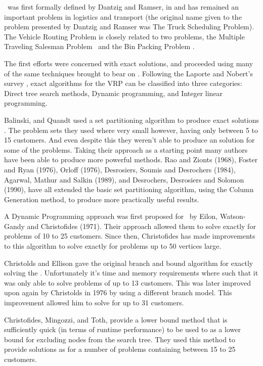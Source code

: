 \VRP\ was first formally defined by Dantzig and Ramser, in \cite{Dantzig:1959} and has remained an important problem in logistics and transport (the original name given to the problem presented by Dantzig and Ramser was The Truck Scheduling Problem). The Vehicle Routing Problem is closely related to two problems, the Multiple Traveling Salesman Problem \MTSP\ and the Bin Packing Problem \BPP.

The first efforts were concerned with exact solutions, and proceeded using many of the same techniques brought to bear on \TSP. 
Following the Laporte and Nobert's survey \cite{LANO:87}, exact algorithms for the VRP can be classified into three categories: Direct tree search methods, Dynamic programming, and Integer linear programming.

Balinski, and Quandt used a set partitioning algorithm to produce exact solutions \cite{balinski:64}. The problem sets they used where very small however, having only between 5 to 15 customers. And even despite this they weren't able to produce an solution for some of the problems. Taking their approach as a starting point many authors have been able to produce more powerful methods. Rao and Zionts (1968), Foster and Ryan (1976), Orloff (1976), Desrosiers, Soumis and Desrochers (1984), Agarwal, Mathur and Salkin (1989), and Desrochers, Desrosiers and Solomon (1990), have all extended the basic set partitioning algorithm, using the Column Generation method, to produce more practically useful results. 

A Dynamic Programming approach was first proposed for \VRP\ by Eilon, Watson-Gandy and Christofides (1971). Their approach allowed them to solve exactly for problems of 10 to 25 customers. Since then, Christofides has made improvements to this algorithm to solve exactly for problems up to 50 vertices large.

Christolds and Ellison gave the original branch and bound algorithm for exactly solving the \VRP \cite{CE:1969}. Unfortunately it's time and memory requirements where such that it was only able to solve problems of up to 13 customers. This was later improved upon again by Christolds in 1976 by using a different branch model. This improvement allowed him to solve for up to 31 customers. 

Christofides, Mingozzi, and Toth, \cite{CMT:1981} provide a lower bound method that is sufficiently quick (in terms of runtime performance) to be used to as a lower bound for excluding nodes from the search tree. They used this method to provide solutions as for a number of problems containing between 15 to 25 customers.    
  
